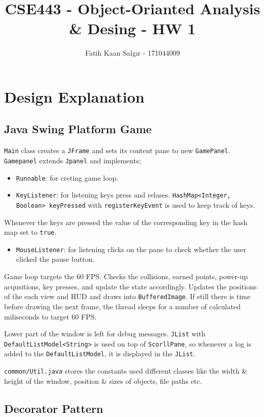 \documentclass[a4paper]{article}
\author{Fatih Kaan Salgır - 171044009}
\date{}
\title{CSE443 - Object-Orianted Analysis \& Desing - HW 1}
\begin{document}
\maketitle

\section*{Design Explanation}
\label{sec:org7fe60f4}

\subsection*{Java Swing Platform Game}
\label{sec:orge33f708}

\texttt{Main} class creates a \texttt{JFrame} and sets its content pane to new \texttt{GamePanel}.
\texttt{Gamepanel} extends \texttt{Jpanel} and implements;
\begin{itemize}
\item \texttt{Runnable}: for creting game loop.
\item \texttt{KeyListener}: for listening keys press and relases. \texttt{HashMap<Integer, Boolean> keyPressed} with \texttt{registerKeyEvent} is used to keep track of keys.
\end{itemize}
Whenever the keys are pressed the value of the corresponding key in the hash map set to \texttt{true}.
\begin{itemize}
\item \texttt{MouseListener}: for listening clicks on the pane to check whether the user clicked the pause button.
\end{itemize}


Game loop targets the 60 FPS.
Checks the collisions, earned points, power-up acqusitions, key presses, and update the state accordingly.
Updates the positions of the each view and HUD and draws into \texttt{BufferedImage}.
If still there is time before drawing the next frame, the thread sleeps for a number of calculated miliseconds to target 60 FPS.

Lower part of the window is left for debug messages.
\texttt{JList} with \texttt{DefaultListModel<String>} is used on top of \texttt{ScorllPane}, so whenever a log is added to the \texttt{DefaultListModel}, it is displayed in the \texttt{JList}.

\texttt{common/Util.java} stores the constants used different classes like the width \& height of the window, position \& sizes of objects, file paths etc.


\newpage
\subsection*{Decorator Pattern}
\label{sec:orgc7205b9}
\end{document}
